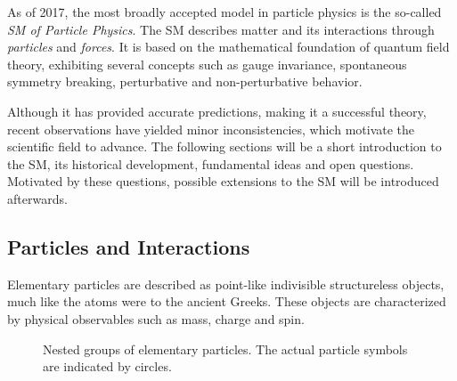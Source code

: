 As of 2017, the most broadly accepted model in particle physics is the so-called \emph{\acl{SM} of Particle Physics}. The \acl{SM} describes matter and its interactions through \emph{particles} and \emph{forces}. It is based on the mathematical foundation of quantum field theory, exhibiting several concepts such as gauge invariance, spontaneous symmetry breaking, perturbative and non-perturbative behavior.
 
Although it has provided accurate predictions, making it a successful theory, recent observations have yielded minor inconsistencies, which motivate the scientific field to advance. The following sections will be a short introduction to the \acl{SM}, its historical development, fundamental ideas and open questions. Motivated by these questions, possible extensions to the \acl{SM} will be introduced afterwards.

\subsection{Particles and Interactions}
Elementary particles are described as point-like indivisible structureless objects, much like the atoms were to the ancient Greeks. These objects are characterized by physical observables such as mass, charge and spin.

\begin{figure}
    \centering
    \caption{Nested groups of elementary particles. The actual particle symbols are indicated by circles.}
    \label{fig:particle_groups}
\end{figure}


